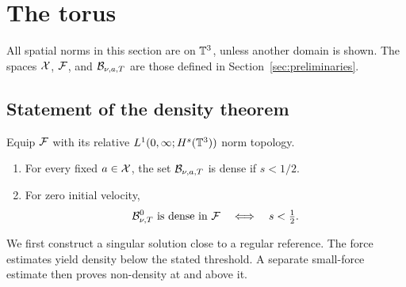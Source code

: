 \section{The torus}\label{sec:torus}
All spatial norms in this section are on $\mathbb T^3$, unless another domain is
shown. The spaces $\mathcal X$, $\mathcal F$, and $\mathcal B_{\nu,a,T}$ are those defined in
Section~\ref{sec:preliminaries}.
\subsection{Statement of the density theorem}
\begin{theorem}\label{thm:main}
Equip $\mathcal F$ with its relative $L^1(0,\infty;H^s(\mathbb T^3))$ norm topology.
\begin{enumerate}[label=(\roman*),nosep]
\item For every fixed $a\in\mathcal X$, the set $\mathcal B_{\nu,a,T}$ is dense if $s<1/2$.
\item For zero initial velocity,
\[
 \mathcal B^0_{\nu,T}\text{ is dense in }\mathcal F
 \quad\Longleftrightarrow\quad s<\tfrac12.
\]
\end{enumerate}
\end{theorem}

We first construct a singular solution close to a regular reference. The
force estimates yield density below the stated threshold. A separate
small-force estimate then proves non-density at and above it.

